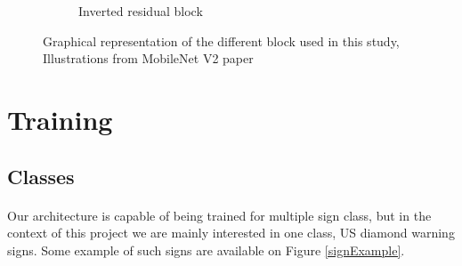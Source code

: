 \begin{figure}
\begin{center}
\begin{subfigure}[t]{.5\linewidth}
      \caption{Inverted residual block \cite{sandler2018mobilenetv2}}
      \label{fig:invertedbottleneckblock}
    \end{subfigure}
    \caption{Graphical representation of the different block used in this study, Illustrations from MobileNet V2 paper \cite{sandler2018mobilenetv2}}
  \end{center}
\end{figure}


\section{Training}
\subsection{Classes}
\paragraph{}
Our architecture is capable of being trained for multiple sign class, but in the context of this project we are mainly interested in one class, US diamond warning signs. Some example of such signs are available on Figure \ref{signExample}.

